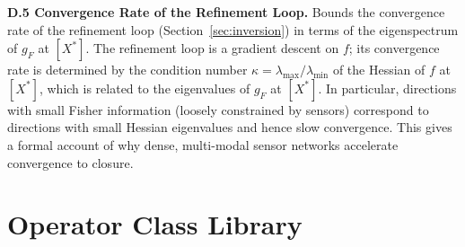 \documentclass[12pt, oneside]{article}
\begin{document}
{\medskip
\textbf{D.5 Convergence Rate of the Refinement Loop.}
Bounds the convergence rate of the refinement loop (Section~\ref{sec:inversion}) in terms
of the eigenspectrum of $g_F$ at $[X^*]$. The refinement loop is a gradient descent on $f$;
its convergence rate is determined by the condition number $\kappa = \lambda_{\max}/\lambda_{\min}$
of the Hessian of $f$ at $[X^*]$, which is related to the eigenvalues of $g_F$ at $[X^*]$.
In particular, directions with small Fisher information (loosely constrained by sensors)
correspond to directions with small Hessian eigenvalues and hence slow convergence. This
gives a formal account of why dense, multi-modal sensor networks accelerate convergence
to closure.
}

\section{Operator Class Library}
\label{app:operators}
\end{document}
